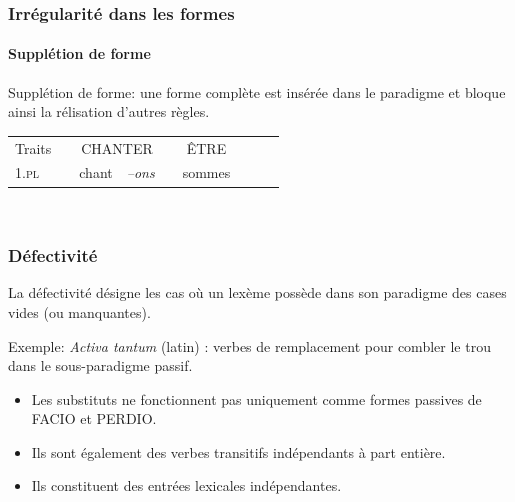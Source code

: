 \begin{frame}
\frametitle{Irrégularité dans les formes}
\framesubtitle{Supplétion de forme \cite{boye06}}
Supplétion de forme: une forme complète est insérée dans le paradigme
et bloque ainsi la rélisation d'autres règles.

\begin{table}
\begin{tabular}{|l| p{1mm}|ll|p{1mm}|ll|p{1mm}cl}
\cline{1-1}\cline{3-4}\cline{6-7}
Traits&&\multicolumn{2}{|c|}{\scriptsize{CHANTER}}&&\multicolumn{2}{|c|}{\scriptsize{ÊTRE}}&&\\
\cline{1-1}\cline{3-4}\cline{6-7}
\textsc{1.pl}&&chant& {\em --ons}&&\multicolumn{2}{|l|}{\cellcolor{mandarine} sommes}& {\em }&&\\
\cline{1-1}\cline{3-4}\cline{6-7}
\end{tabular}\\[1mm]
\end{table}
\end{frame}




\begin{frame}
\frametitle{Défectivité}
La défectivité désigne les cas où un lexème possède dans son paradigme des
cases vides (ou manquantes). 

Exemple: {\em Activa tantum} (latin) \cite{kiparsky04}: verbes de
remplacement pour combler le trou dans le sous-paradigme passif.

\noindent{}

\pause
\begin{itemize}
\item Les substituts ne
      fonctionnent pas uniquement comme formes passives de  {\scriptsize{FACIO}} 
    et {\scriptsize{PERDIO}}.
  \item Ils sont également des verbes transitifs
    indépendants à part entière.
  \item Ils constituent des entrées lexicales
    indépendantes.
\end{itemize}
\end{frame}

